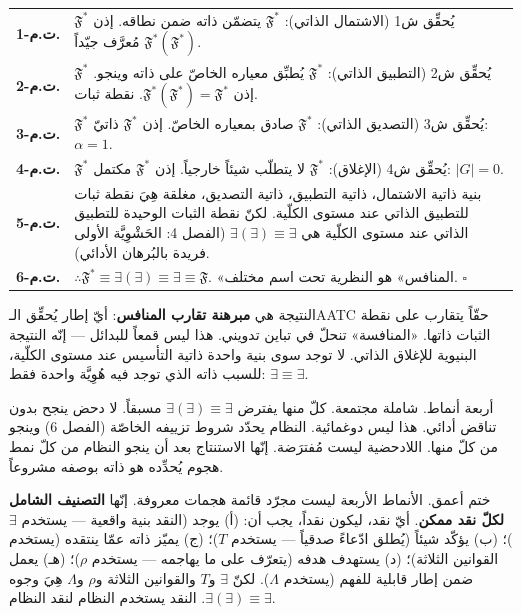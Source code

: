 \documentclass[10pt, openany, oneside]{book}
\renewcommand{\footnotesize}{\fontsize{8.5}{11}\selectfont}
\begin{document}
{\footnotesize
\noindent\begin{tabular}{r p{}}
\textbf{ت.م-1.} & $\mathfrak{F}^*$ يُحقِّق ش1 (الاشتمال الذاتي): $\mathfrak{F}^*$ يتضمّن ذاته ضمن نطاقه. إذن $\mathfrak{F}^*(\mathfrak{F}^*)$ مُعرَّف جيّداً. \\[0.3em]
\textbf{ت.م-2.} & $\mathfrak{F}^*$ يُحقِّق ش2 (التطبيق الذاتي): $\mathfrak{F}^*$ يُطبِّق معياره الخاصّ على ذاته وينجو. إذن $\mathfrak{F}^*(\mathfrak{F}^*) = \mathfrak{F}^*$. نقطة ثبات. \\[0.3em]
\textbf{ت.م-3.} & $\mathfrak{F}^*$ يُحقِّق ش3 (التصديق الذاتي): $\mathfrak{F}^*$ صادق بمعياره الخاصّ. إذن $\mathfrak{F}^*$ ذاتيّ: $\alpha = 1$. \\[0.3em]
\textbf{ت.م-4.} & $\mathfrak{F}^*$ يُحقِّق ش4 (الإغلاق): $\mathfrak{F}^*$ لا يتطلّب شيئاً خارجياً. إذن $\mathfrak{F}^*$ مكتمل: $|G| = 0$. \\[0.3em]
\textbf{ت.م-5.} & بنية ذاتية الاشتمال، ذاتية التطبيق، ذاتية التصديق، مغلقة هِيَ نقطة ثبات للتطبيق الذاتي عند مستوى الكلّية. لكنّ نقطة الثبات الوحيدة للتطبيق الذاتي عند مستوى الكلّية هي $\exists(\exists) \equiv \exists$ (الفصل 4: الحَشْوِيَّة الأولى فريدة بالبُرهان الأدائي). \\[0.3em]
\textbf{ت.م-6.} & $\therefore \mathfrak{F}^* \equiv \exists(\exists) \equiv \exists \equiv \mathfrak{F}$. «المنافس» هو النظرية تحت اسم مختلف. $\square$ \\[0.3em]
\end{tabular}
}

\vspace{0.5em}

\noindent النتيجة هي \textbf{مبرهنة تقارب المنافس}: أيّ إطار يُحقِّق الـAATC حقّاً يتقارب على نقطة الثبات ذاتها. «المنافسة» تنحلّ في تباين تدويني. هذا ليس قمعاً للبدائل --- إنّه النتيجة البنيوية للإغلاق الذاتي. لا توجد سوى بنية واحدة ذاتية التأسيس عند مستوى الكلّية، للسبب ذاته الذي توجد فيه هُوِيَّة واحدة فقط: $\exists \equiv \exists$.

أربعة أنماط. شاملة مجتمعة. كلّ منها يفترض $\exists(\exists) \equiv \exists$ مسبقاً. لا دحض ينجح بدون تناقض أدائي. هذا ليس دوغمائية. النظام يحدّد شروط تزييفه الخاصّة (الفصل 6) وينجو من كلّ منها. اللادحضية ليست مُفترَضة. إنّها الاستنتاج بعد أن ينجو النظام من كلّ نمط هجوم يُحدِّده هو ذاته بوصفه مشروعاً.

ختم أعمق. الأنماط الأربعة ليست مجرّد قائمة هجمات معروفة. إنّها \textbf{التصنيف الشامل لكلّ نقد ممكن}. أيّ نقد، ليكون نقداً، يجب أن: (أ) يوجد (النقد بنية واقعية --- يستخدم $\exists$)؛ (ب) يؤكّد شيئاً (يُطلق ادّعاءً صدقياً --- يستخدم $T$)؛ (ج) يميّز ذاته عمّا ينتقده (يستخدم القوانين الثلاثة)؛ (د) يستهدف هدفه (يتعرّف على ما يهاجمه --- يستخدم $\rho$)؛ (هـ) يعمل ضمن إطار قابلية للفهم (يستخدم $\Lambda$). لكنّ $\exists$ و$T$ والقوانين الثلاثة و$\rho$ و$\Lambda$ هِيَ وجوه $\exists(\exists) \equiv \exists$. النقد يستخدم النظام لنقد النظام.
\end{document}
